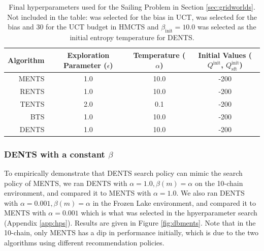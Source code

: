         \begin{table}[]
            \centering
            \begin{tabular}{r|ccc} 
                Algorithm   & Exploration Parameter ($\epsilon$)    & Temperature ($\alpha$)    & Initial Values ($Q^{\text{init}}$, $Q^{\text{init}}_{\text{sft}}$)    \\
                \hline
                MENTS       & 1.0                                   & 10.0                      & -200                                                                  \\
                RENTS       & 1.0                                   & 10.0                      & -200                                                                  \\
                TENTS       & 2.0                                   & 0.1                       & -200                                                                  \\
                BTS         & 1.0                                   & 10.0                      & -200                                                                  \\
                DENTS       & 1.0                                   & 10.0                      & -200                                                                  \\
            \end{tabular}
            \caption[Final hyperparameters used for the Sailing Problem in Section \ref{sec:gridworlds}]{Final hyperparameters used for the Sailing Problem in Section \ref{sec:gridworlds}. Not included in the table: %
             was selected for the bias in UCT, %
             was selected for the bias and 30 for the UCT budget in HMCTS and $\beta_{\text{init}}=10.0$ was selected as the initial entropy temperature for DENTS. \label{table:hyper_s}}
        \end{table}
        
            
            
            
            
            

	\subsubsection{DENTS with a constant $\beta$} \label{app:dents_mimic_ments}
		To empirically demonstrate that DENTS search policy can mimic the search policy of MENTS, we ran DENTS with $\alpha=1.0,\beta(m)=\alpha$ on the 10-chain environment, and compared it to MENTS with $\alpha=1.0$. We also ran DENTS with $\alpha=0.001, \beta(m)=\alpha$ in the Frozen Lake environment, and compared it to MENTS with $\alpha=0.001$ which is what was selected in the hpyerparameter search (Appendix \ref{app:hps}). Results are given in Figure \ref{fig:dbments}. Note that in the 10-chain, only MENTS has a dip in performance initially, which is due to the two algorithms using different recommendation policies.
		

